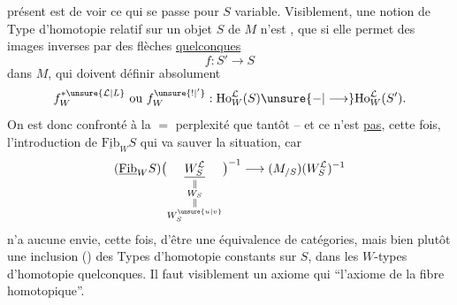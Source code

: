 présent est de voir ce qui se passe pour $S$ variable. Visiblement, une notion de Type d'homotopie relatif sur un objet  $S$ de $M$ n'est , que si elle permet des images inverses par des flèches \uline{quelconques}
\[
f:S'\longrightarrow S
\]
dans $M$, qui doivent définir absolument
\[
f^{*\unsure{\mathcal L|L}}_{W}\ \text{ou}\ f^{\unsure{!|'}}_{W}:
\mathrm{Ho}_{W}^{\mathcal L}(S)\unsure{-|\longrightarrow}\mathrm{Ho}_{W}^{\mathcal L}(S').
\]
On est donc confronté à la $=$ perplexité que tantôt -- et ce n'est \uline{pas}, cette fois, l'introduction de $\underline{\mathrm{Fib}}_W S$ qui va sauver la situation, car
\[
(\underline{\mathrm{Fib}}_W S)
\bigl(\underset{\substack{\Vert\\W_S\\\Vert\\W_S^{\unsure{u|v}}}}{\underline{W_S^{\mathcal L}}}\bigr)^{-1}
\longrightarrow (M_{/S})(W_S^{\mathcal L})^{-1}
\]
n'a aucune envie, cette fois, d'être une équivalence de catégories, mais bien plutôt une  inclusion () des Types d'homotopie  constants sur $S$, dans les $W$-types d'homotopie quelconques. Il faut visiblement un axiome qui   ``l'axiome  de la fibre homotopique''.
